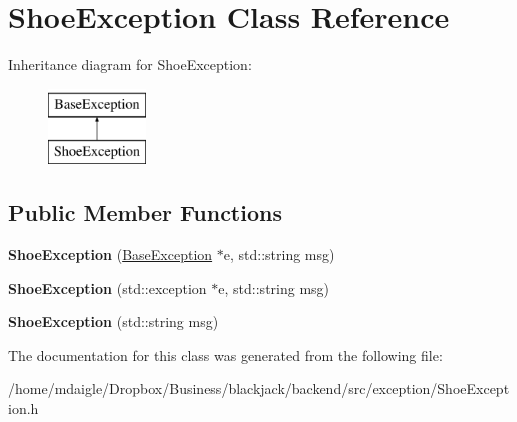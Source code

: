 \hypertarget{classShoeException}{
\section{\-Shoe\-Exception \-Class \-Reference}
\label{d5/df0/classShoeException}
}
\-Inheritance diagram for \-Shoe\-Exception\-:\begin{figure}[H]
\begin{center}
\leavevmode
\includegraphics[height=2.000000cm]{d5/df0/classShoeException}
\end{center}
\end{figure}
\subsection*{\-Public \-Member \-Functions}
\begin{DoxyCompactItemize}
\item 
\hypertarget{classShoeException_a50369aa37f3a4dc2fae2e12465ee38db}{
{\bfseries \-Shoe\-Exception} (\hyperlink{classBaseException}{\-Base\-Exception} $\ast$e, std\-::string msg)}
\label{d5/df0/classShoeException_a50369aa37f3a4dc2fae2e12465ee38db}

\item 
\hypertarget{classShoeException_abae5fbcc8e620449f28ad23812a09bd4}{
{\bfseries \-Shoe\-Exception} (std\-::exception $\ast$e, std\-::string msg)}
\label{d5/df0/classShoeException_abae5fbcc8e620449f28ad23812a09bd4}

\item 
\hypertarget{classShoeException_a29a1d866ed52720e1955a52e020cef71}{
{\bfseries \-Shoe\-Exception} (std\-::string msg)}
\label{d5/df0/classShoeException_a29a1d866ed52720e1955a52e020cef71}

\end{DoxyCompactItemize}


\-The documentation for this class was generated from the following file\-:\begin{DoxyCompactItemize}
\item 
/home/mdaigle/\-Dropbox/\-Business/blackjack/backend/src/exception/\-Shoe\-Exception.\-h\end{DoxyCompactItemize}
